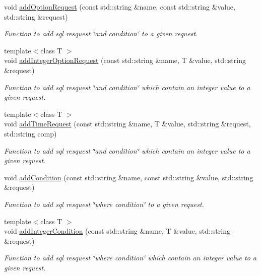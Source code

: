 \begin{DoxyCompactItemize}
void \hyperlink{classQueryServer_a908157c12cbf775d0dd7f270e0f291fe}{addOptionRequest} (const std::string \&name, const std::string \&value, std::string \&request)
\begin{DoxyCompactList}\small\item\em Function to add sql resquest \char`\"{}and condition\char`\"{} to a given request. \item\end{DoxyCompactList}\item 
{\footnotesize template$<$class T $>$ }\\void \hyperlink{classQueryServer_a468ed7f1ccfa3905d010ad67948ea28d}{addIntegerOptionRequest} (const std::string \&name, T \&value, std::string \&request)
\begin{DoxyCompactList}\small\item\em Function to add sql resquest \char`\"{}and condition\char`\"{} which contain an integer value to a given request. \item\end{DoxyCompactList}\item 
{\footnotesize template$<$class T $>$ }\\void \hyperlink{classQueryServer_a43a6aa8774b5a781bb3c5777eb557a24}{addTimeRequest} (const std::string \&name, T \&value, std::string \&request, std::string comp)
\begin{DoxyCompactList}\small\item\em Function to add sql resquest \char`\"{}and condition\char`\"{} which contain an integer value to a given request. \item\end{DoxyCompactList}\item 
void \hyperlink{classQueryServer_ae560033d0f8aac38f1feaa59f37305c8}{addCondition} (const std::string \&name, const std::string \&value, std::string \&request)
\begin{DoxyCompactList}\small\item\em Function to add sql resquest \char`\"{}where condition\char`\"{} to a given request. \item\end{DoxyCompactList}\item 
{\footnotesize template$<$class T $>$ }\\void \hyperlink{classQueryServer_afdb77d4186ae47e469a1eb19bc8a7722}{addIntegerCondition} (const std::string \&name, T \&value, std::string \&request)
\begin{DoxyCompactList}\small\item\em Function to add sql resquest \char`\"{}where condition\char`\"{} which contain an integer value to a given request. \item\end{DoxyCompactList}\item 

\end{DoxyCompactItemize}
